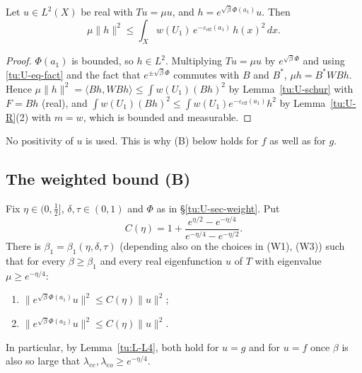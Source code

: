 \begin{lemma}[Inequality (A)]\label{tu:U-A}
Let $u\in L^2(X)$ be real with $Tu=\mu u$, and $h=e^{\sqrt\beta\Phi(a_1)}u$. Then
\[
\mu\|h\|^2\le\int_Xw(U_1)\,e^{-\varepsilon_{\mathrm{eff}}(a_1)}\,h(x)^2\,dx .
\]
\end{lemma}

\begin{proof}
$\Phi(a_1)$ is bounded, so $h\in L^2$. Multiplying $Tu=\mu u$ by $e^{\sqrt\beta\Phi}$ and using \eqref{tu:U-eq-fact} and the
fact that $e^{\pm\sqrt\beta\Phi}$ commutes with $B$ and $B^*$, $\mu h=B^*WBh$. Hence
$\mu\|h\|^2=\langle Bh,WBh\rangle\le\int w(U_1)(Bh)^2$ by Lemma~\ref{tu:U-schur} with $F=Bh$ (real), and
$\int w(U_1)(Bh)^2\le\int w(U_1)e^{-\varepsilon_{\mathrm{eff}}(a_1)}h^2$ by Lemma~\ref{tu:U-R}(2) with $m=w$, which is bounded
and measurable.
\end{proof}

No positivity of $u$ is used. This is why (B) below holds for $f$ as well as for $g$.

\subsection{The weighted bound (B)}

\begin{proposition}[Estimate (B)]\label{tu:U-B}
Fix $\eta\in(0,\frac12]$, $\delta,\tau\in(0,1)$ and $\Phi$ as in \S\ref{tu:U-sec-weight}. Put
\[
C(\eta)=1+\frac{e^{\eta/2}-e^{-\eta/4}}{e^{-\eta/4}-e^{-\eta/2}} .
\]
There is $\beta_1=\beta_1(\eta,\delta,\tau)$ (depending also on the choices in (W1), (W3)) such that for every
$\beta\ge\beta_1$ and every real eigenfunction $u$ of $T$ with eigenvalue $\mu\ge e^{-\eta/4}$:
\begin{enumerate}
\item $\|e^{\sqrt\beta\Phi(a_1)}u\|^2\le C(\eta)\|u\|^2$;
\item $\|e^{\sqrt\beta\Phi(a_2)}u\|^2\le C(\eta)\|u\|^2$.
\end{enumerate}
In particular, by Lemma~\ref{tu:L-L4}, both hold for $u=g$ and for $u=f$ once $\beta$ is also so large that
$\lambda_{ee},\lambda_{eo}\ge e^{-\eta/4}$.
\end{proposition}

